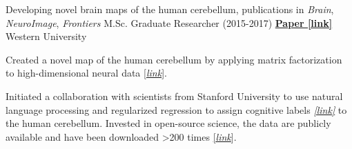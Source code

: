 \begin{cventries}
  \cventry
    {Developing novel brain maps of the human cerebellum, publications in \textit{Brain}, \textit{NeuroImage}, \textit{Frontiers}}
    {M.Sc. Graduate Researcher (2015-2017)} %
    {\href{http://ivrylab.berkeley.edu/uploads/4/1/1/5/41152143/functional_boundaries_in_the_human_cerebellum.pdf}{\textbf{Paper [link]}}}
    {Western University} %
    {
      \begin{cvitems} %
      	\item {Created a novel map of the human cerebellum by applying matrix factorization to high-dimensional neural data {\href{http://www.diedrichsenlab.org/imaging/mdtb.htm}{[\textit{link}}]}.}
      	\item {Initiated a collaboration with scientists from Stanford University to use natural language processing and regularized regression to assign cognitive labels {\href{https://cognitiveatlas.org/}{\textit{[link]}}} to the human cerebellum. Invested in open-source science, the data are publicly available and have been downloaded >200 times {\href{https://openneuro.org/datasets/ds002105/versions/1.1.0}{[\textit{link}}]}.}
      \end{cvitems}
    }
    
\end{cventries}


